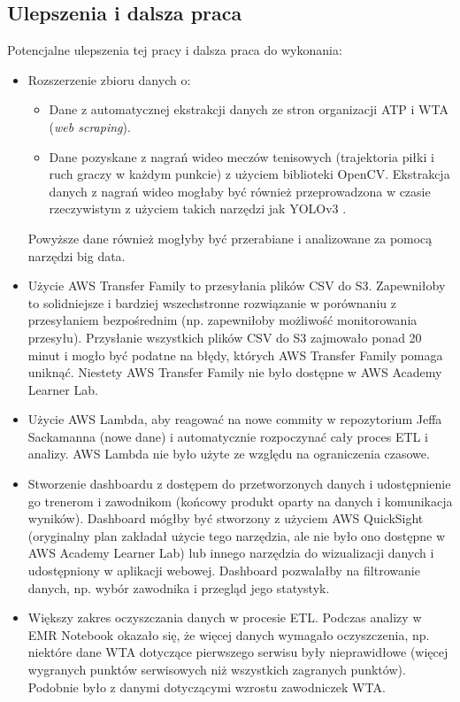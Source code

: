 \documentclass[12pt, a4paper]{article}
\begin{document}
\subsection{Ulepszenia i dalsza praca}
Potencjalne ulepszenia tej pracy i dalsza praca do wykonania:
\begin{itemize}
    \item Rozszerzenie zbioru danych o:
    \begin{itemize}
        \item Dane z automatycznej ekstrakcji danych ze stron organizacji ATP i WTA (\textit{web scraping}).
        \item Dane pozyskane z nagrań wideo meczów tenisowych (trajektoria piłki i ruch graczy w każdym punkcie) z użyciem biblioteki OpenCV. Ekstrakcja danych z nagrań wideo mogłaby być również przeprowadzona w czasie rzeczywistym z użyciem takich narzędzi jak YOLOv3 \cite{yolo_v3}.
    \end{itemize}
    Powyższe dane również mogłyby być przerabiane i analizowane za pomocą narzędzi big data.
    \item Użycie AWS Transfer Family to przesyłania plików CSV do S3. Zapewniłoby to solidniejsze i bardziej wszechstronne rozwiązanie w porównaniu z przesyłaniem bezpośrednim (np. zapewniłoby możliwość monitorowania przesyłu). Przysłanie wszystkich plików CSV do S3 zajmowało ponad 20 minut i mogło być podatne na błędy, których AWS Transfer Family pomaga uniknąć. Niestety AWS Transfer Family nie było dostępne w AWS Academy Learner Lab.
    \item Użycie AWS Lambda, aby reagować na nowe commity w repozytorium Jeffa Sackamanna (nowe dane) i automatycznie rozpoczynać cały proces ETL i analizy. AWS Lambda nie było użyte ze względu na ograniczenia czasowe.
    \item Stworzenie dashboardu z dostępem do przetworzonych danych i udostępnienie go trenerom i zawodnikom (końcowy produkt oparty na danych i komunikacja wyników). Dashboard mógłby być stworzony z użyciem AWS QuickSight (oryginalny plan zakładał użycie tego narzędzia, ale nie było ono dostępne w AWS Academy Learner Lab) lub innego narzędzia do wizualizacji danych i udostępniony w aplikacji webowej. Dashboard pozwalałby na filtrowanie danych, np. wybór zawodnika i przegląd jego statystyk.
    \item Większy zakres oczyszczania danych w procesie ETL. Podczas analizy w EMR Notebook okazało się, że więcej danych wymagało oczyszczenia, np. niektóre dane WTA dotyczące pierwszego serwisu były nieprawidłowe (więcej wygranych punktów serwisowych niż wszystkich zagranych punktów). Podobnie było z danymi dotyczącymi wzrostu zawodniczek WTA.

\end{itemize}
\end{document}
